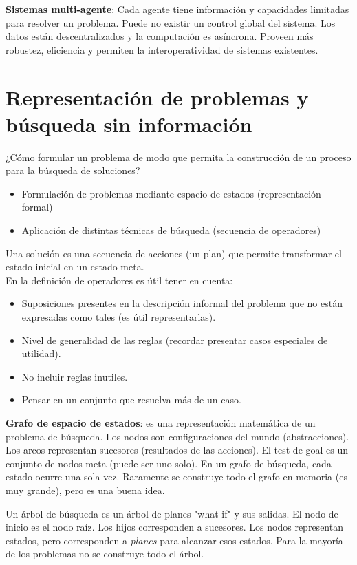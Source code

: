\textbf{Sistemas multi-agente}: Cada agente tiene información y capacidades
limitadas para resolver un problema. Puede no existir un control global del
sistema. Los datos están descentralizados y la computación es asíncrona.
Proveen más robustez, eficiencia y permiten la interoperatividad de sistemas
existentes.

\section{Representación de problemas y búsqueda sin información}
¿Cómo formular un problema de modo que permita la construcción de un proceso
para la búsqueda de soluciones?
\begin{itemize}
    \item Formulación de problemas mediante espacio de estados (representación
        formal)
    \item Aplicación de distintas técnicas de búsqueda (secuencia de operadores)
\end{itemize}
Una solución es una secuencia de acciones (un plan) que permite transformar el
estado inicial en un estado meta.\\
En la definición de operadores es útil tener en cuenta:
\begin{itemize}
    \item Suposiciones presentes en la descripción informal del problema que no
        están expresadas como tales (es útil representarlas).
    \item Nivel de generalidad de las reglas (recordar presentar casos
        especiales de utilidad).
    \item No incluir reglas inutiles.
    \item Pensar en un conjunto que resuelva más de un caso.
\end{itemize}
\textbf{Grafo de espacio de estados}: es una representación matemática de un
problema de búsqueda. Los nodos son configuraciones del mundo (abstracciones).
Los arcos representan sucesores (resultados de las acciones). El test de goal
es un conjunto de nodos meta (puede ser uno solo). En un grafo de búsqueda,
cada estado ocurre una sola vez. Raramente se construye todo el grafo en memoria
(es muy grande), pero es una buena idea.

Un árbol de búsqueda es un árbol de planes "what if" y sus salidas. El nodo de
inicio es el nodo raíz. Los hijos corresponden a sucesores. Los nodos representan
estados, pero corresponden a \textit{planes} para alcanzar esos estados. Para
la mayoría de los problemas no se construye todo el árbol.

